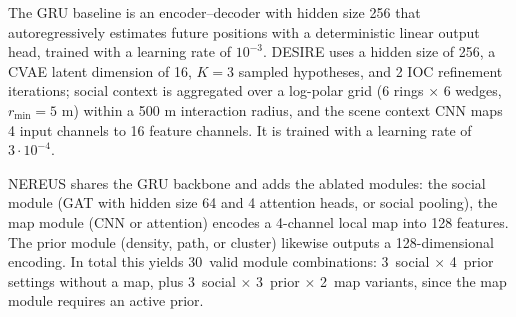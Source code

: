 \documentclass[runningheads]{preamp/llncs}
\begin{document}
The GRU baseline is an encoder–decoder with hidden size 256 that autoregressively estimates future positions with a deterministic linear output head, trained with a learning rate of $10^{-3}$.
DESIRE uses a hidden size of 256, a CVAE latent dimension of 16, $K{=}3$ sampled hypotheses, and 2 IOC refinement iterations; social context is aggregated over a log-polar grid (6 rings × 6 wedges, $r_{\min}{=}5$ m) within a 500 m interaction radius, and the scene context CNN maps 4 input channels to 16 feature channels. It is trained with a learning rate of $3\cdot10^{-4}$.

NEREUS shares the GRU backbone and adds the ablated modules:
the social module (GAT with hidden size 64 and 4 attention heads, or social pooling),
the map module (CNN or attention) encodes a 4-channel local map into 128 features.
%
The prior module (density, path, or cluster) likewise outputs a 128-dimensional encoding.
%
In total this yields 30~valid module combinations:
3~social $\times$ 4~prior settings without a map,
plus
3~social $\times$ 3~prior $\times$ 2~map variants,
since the map module requires an active prior.
%


\end{document}
